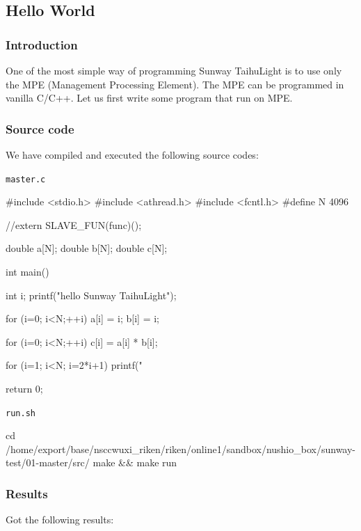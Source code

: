 \subsection{Hello World}
\subsubsection{Introduction}

One of the most simple way of programming Sunway TaihuLight is to use only the
MPE
(Management Processing Element).
The MPE can be programmed in vanilla C/C++. Let us first write some program
that run on MPE.




\subsubsection{Source code}
 We have compiled and executed the following source codes:

\verb`master.c`
\begin{code}
#include <stdio.h>
#include <athread.h>
#include <fcntl.h>
#define N 4096


//extern SLAVE_FUN(func)();

double a[N];
double b[N];
double c[N];

int main() {
  int i;
  printf("hello Sunway TaihuLight\n");

  for (i=0; i<N;++i){
    a[i] = i;
    b[i] = i;
  }

  for (i=0; i<N;++i){
    c[i] = a[i] * b[i];
  }

  for (i=1; i<N; i=2*i+1){
    printf("%
  }

  return 0;
}

\end{code}

\verb`run.sh`
\begin{code}

cd /home/export/base/nsccwuxi_riken/riken/online1/sandbox/nushio_box/sunway-test/01-master/src/
make && make run
    
\end{code}

\subsubsection{Results}

Got the following results:

